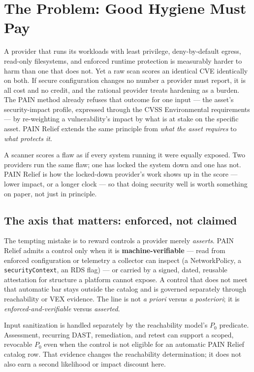 \documentclass[11pt]{article}
\newcommand{\code}[1]{\texttt{#1}}
\begin{document}
\section{The Problem: Good Hygiene Must Pay}
A provider that runs its workloads with least privilege, deny-by-default egress,
read-only filesystems, and enforced runtime protection is measurably harder to
harm than one that does not. Yet a raw scan scores an identical CVE identically
on both. If secure configuration changes no number a provider must report, it is
all cost and no credit, and the rational provider treats hardening as a burden.
The PAIN method already refuses that outcome for one input --- the asset's
security-impact profile, expressed through the CVSS Environmental requirements ---
by re-weighting a vulnerability's impact by what is at stake on the specific asset.
PAIN Relief extends the same principle from \emph{what the asset requires} to
\emph{what protects it}.

\begin{plain}
A scanner scores a flaw as if every system running it were equally exposed. Two
providers run the same flaw; one has locked the system down and one has not.
PAIN Relief is how the locked-down provider's work shows up in the score ---
lower impact, or a longer clock --- so that doing security well is worth
something on paper, not just in principle.
\end{plain}

\subsection{The axis that matters: enforced, not claimed}
The tempting mistake is to reward controls a provider merely \emph{asserts}.
PAIN Relief admits a control only when it is
\textbf{machine-verifiable} --- read from enforced configuration or telemetry a
collector can inspect (a NetworkPolicy, a \code{securityContext}, an RDS flag) ---
or carried by a signed, dated, reusable attestation for structure a platform
cannot expose. A control that does not meet that automatic bar stays outside the
catalog and is governed separately through reachability or VEX evidence. The
line is not \emph{a priori} versus \emph{a posteriori}; it is
\emph{enforced-and-verifiable} versus \emph{asserted}.

Input sanitization is handled separately by the reachability model's $P_0$
predicate. Assessment, recurring DAST, remediation, and retest can support a
scoped, revocable $P_0$ even when the control is not eligible for an automatic
PAIN Relief catalog row. That evidence changes the reachability determination; it
does not also earn a second likelihood or impact discount here.
\end{document}
